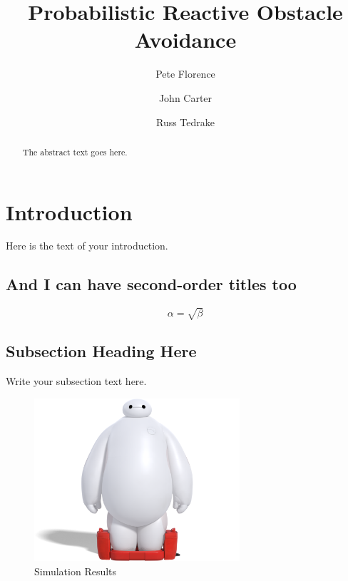 \documentclass{llncs}
\begin{document}
\title{Probabilistic Reactive Obstacle Avoidance}
\author{Pete Florence \and John Carter \and Russ Tedrake }



\maketitle

\begin{abstract}
The abstract text goes here.
\end{abstract}

\section{Introduction}
Here is the text of your introduction.

\subsection{And I can have second-order titles too}

\begin{equation}
    \label{simple_equation}
    \alpha = \sqrt{ \beta }
\end{equation}

\subsection{Subsection Heading Here}
Write your subsection text here.

\begin{figure}
    \centering
    \includegraphics[width=3.0in]{images/baymax.png}
    \caption{Simulation Results}
    \label{simulationfigure}
\end{figure}
\end{document}
